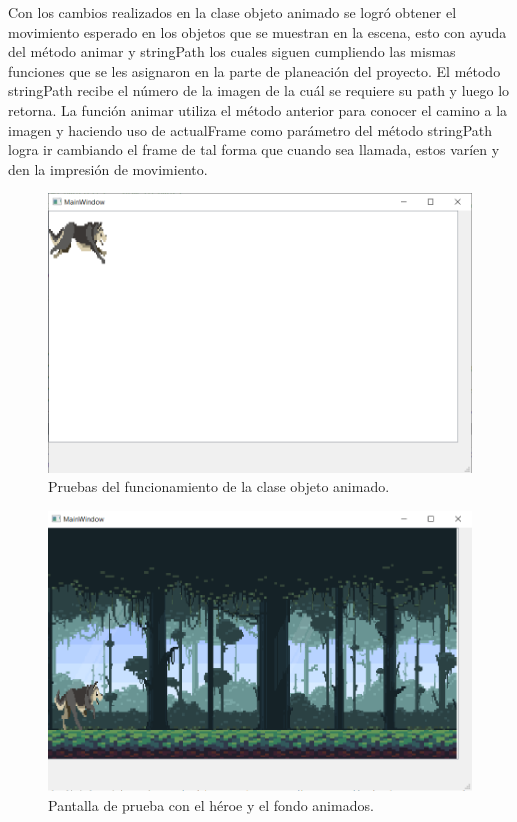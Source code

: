 \documentclass{article}
\begin{document}
Con los cambios realizados en la clase objeto animado se logró obtener el movimiento esperado en los objetos que se muestran en la escena, esto con ayuda del método animar y stringPath los cuales siguen cumpliendo las mismas funciones que se les asignaron en la parte de planeación del proyecto. El método stringPath recibe el número de la imagen de la cuál se requiere su path y luego lo retorna. La función animar utiliza el método anterior para conocer el camino a la imagen y haciendo uso de actualFrame como parámetro del método stringPath logra ir cambiando el frame de tal forma que cuando sea llamada, estos varíen y den la impresión de movimiento.

\newpage
\begin{figure}[h]
\includegraphics[scale=0.6]{Images/animacionInicial.png}
\centering
\caption{Pruebas del funcionamiento de la clase objeto animado.}
\label{fig:animacion1}
\end{figure}

\begin{figure}[h]
\includegraphics[scale=0.6]{Images/animaciones.png}
\centering
\caption{Pantalla de prueba con el héroe y el fondo animados.}
\label{fig:animacion}
\end{figure}
\end{document}
